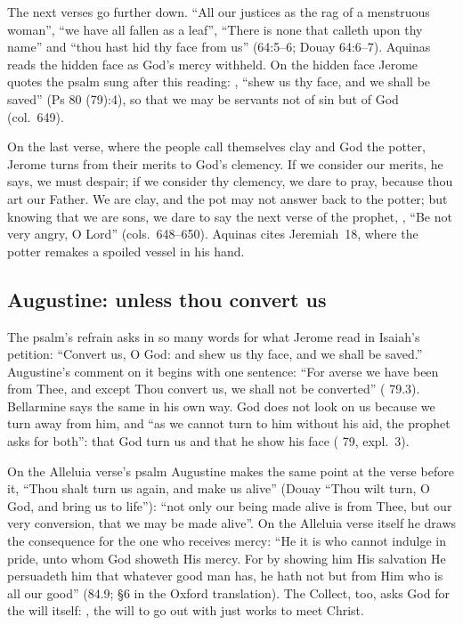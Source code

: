 The next verses go further down. ``All our justices as the rag of a menstruous
woman'', ``we have all fallen as a leaf'', ``There is none that calleth upon
thy name'' and ``thou hast hid thy face from us'' (64:5--6; Douay 64:6--7).
Aquinas reads the hidden face as God's mercy withheld. On the hidden face
Jerome quotes the psalm sung after this reading: , ``shew us thy face, and we shall be saved'' (Ps
80 (79):4), so that we may be servants not of sin but of God (col.~649).

On the last verse, where the people call themselves clay and God the potter,
Jerome turns from their merits to God's clemency. If we consider our merits,
he says, we must despair; if we consider thy clemency, we dare to pray, because thou art
our Father. We are clay, and the pot may not answer back to the potter; but
knowing that we are sons, we dare to say the next verse of the prophet,
, ``Be not very angry, O Lord''
(cols.~648--650). Aquinas cites Jeremiah~18, where the potter remakes a
spoiled vessel in his hand.

\subsection{Augustine: unless thou convert us}

The psalm's refrain asks in so many words for what Jerome read in Isaiah's
petition: ``Convert us, O God: and shew us thy face, and we shall be saved.'' Augustine's comment on
it begins with one sentence: ``For averse we have been from Thee, and except Thou
convert us, we shall not be converted'' ( 79.3).
Bellarmine says the same in his own way. God does not look on us because we
turn away from him, and ``as we cannot turn to him without his aid, the
prophet asks for both'': that God turn us and that he show his face
( 79, expl.~3).

On the Alleluia verse's psalm Augustine makes the same point at the verse
before it, ``Thou shalt turn us again, and make us alive'' (Douay ``Thou wilt
turn, O God, and bring us to life''): ``not only our being made alive is from
Thee, but our very conversion, that we may be made alive''. On the Alleluia
verse itself he draws the consequence for the one who receives mercy: ``He it
is who cannot indulge in pride, unto whom God showeth His mercy. For by
showing him His salvation He persuadeth him that whatever good man has, he
hath not but from Him who is all our good'' (84.9; §6 in the Oxford
translation). The Collect, too, asks God for the will itself: , the will to go out with just works
to meet Christ.

